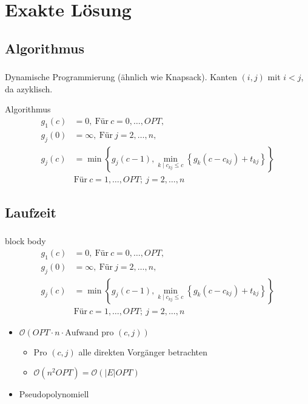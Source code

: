 \documentclass{beamer}
\begin{document}
\section{Exakte Lösung}
\subsection{Algorithmus}
\begin{frame}
   \frametitle{\insertsection}
   \framesubtitle{\insertsubsection}

   Dynamische Programmierung (ähnlich wie Knapsack). Kanten $(i,j)$ mit $i < j$,
   da azyklisch.
   \begin{block}{Algorithmus}
      \begin{align*}
         g_1(c) & =  0, ~ \text{Für} ~ c = 0,\ldots,OPT, \\
         g_j(0) & =  \infty, ~ \text{Für} ~ j = 2,\ldots,n, \\
         g_j(c) & =  \min\left\{g_j(c-1), \min_{k \mid c_{kj} \le
   c}\left\{g_k(c-c_{kj}) + t_{kj}\right\}\right\} \\
                & \text{Für} ~ c= 1,\ldots,OPT; ~ j = 2,\ldots,n
\end{align*}
   \end{block}
\end{frame}

\subsection{Laufzeit}

\begin{frame}
   \frametitle{\insertsection}
   \framesubtitle{\insertsubsection}
   \begin{beamercolorbox}[center,wd=\paperwidth]{block body}
      \begin{align*}
         g_1(c) & =  0, ~ \text{Für} ~ c = 0,\ldots,OPT, \\
         g_j(0) & =  \infty, ~ \text{Für} ~ j = 2,\ldots,n, \\
         g_j(c) & =  \min\left\{g_j(c-1), \min_{k \mid c_{kj} \le c}\left\{g_k(c-c_{kj}) + t_{kj}\right\}\right\} \\
                & \text{Für} ~ c= 1,\ldots,OPT; ~ j = 2,\ldots,n
      \end{align*}
   \end{beamercolorbox}

   \begin{itemize}
      \item $\mathcal{O}(OPT\cdot n \cdot \text{Aufwand pro $(c,j)$})$
         \begin{itemize}
            \item Pro $(c,j)$ alle direkten Vorgänger betrachten
            \item $\mathcal{O}\left(n^2 OPT\right) = \mathcal{O}\left(|E| OPT\right)$
         \end{itemize}
      \item Pseudopolynomiell
   \end{itemize}

\end{frame}
\end{document}
